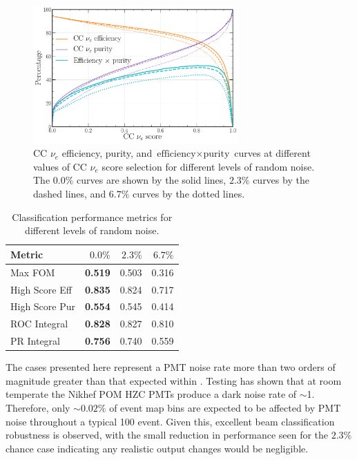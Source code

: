 \begin{figure} %
    \includegraphics[width=0.7\textwidth]{diagrams/7-results/calib_noise_nuel_eff_curves.pdf}
    \caption[CC $\nu_{e}$ efficiency and purity curves for different levels of random noise]
    {CC $\nu_{e}$ efficiency, purity, and $\text{efficiency}\times\text{purity}$ curves at
        different values of CC $\nu_{e}$ score selection for different levels of random noise. The
        $0.0\%$ curves are shown by the solid lines, $2.3\%$ curves by the dashed lines, and
        $6.7\%$ curves by the dotted lines.}
    \label{fig:calib_noise_nuel_eff_curves}
\end{figure}

\begin{table} %
    \begin{tabular}{lrrr}
        Metric         & $0.0\%$        & $2.3\%$ & $6.7\%$ \\
        \midrule
        Max FOM        & \textbf{0.519} & 0.503   & 0.316   \\
        High Score Eff & \textbf{0.835} & 0.824   & 0.717   \\
        High Score Pur & \textbf{0.554} & 0.545   & 0.414   \\
        ROC Integral   & \textbf{0.828} & 0.827   & 0.810   \\
        PR Integral    & \textbf{0.756} & 0.740   & 0.559   \\
    \end{tabular}
    \caption[Classification performance metrics for different levels of random noise]
    {Classification performance metrics for different levels of random noise.}
    \label{tab:calib_time}
\end{table}

The cases presented here represent a PMT noise rate more than two orders of magnitude greater than
that expected within \chipsfive. Testing has shown that at room temperate the Nikhef POM HZC PMTs
produce a dark noise rate of $\sim$\unit{1}{}. Therefore, only $\sim0.02\%$ of event map
bins are expected to be affected by PMT noise throughout a typical \unit{100}{} event.
Given this, excellent beam classification robustness is observed, with the small reduction in
performance seen for the $2.3\%$ chance case indicating any realistic output changes would be
negligible.

